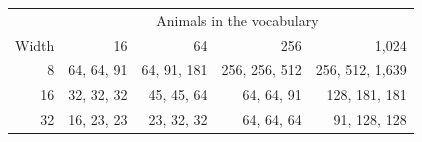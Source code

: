 \begin{tabular}{@{}rrrrr@{}}
\toprule
 & \multicolumn{4}{c}{Animals in the vocabulary} \\
Width & 16 & 64 & 256 & 1{,}024 \\
\midrule
8 & 64, 64, 91 & 64, 91, 181 & 256, 256, 512 & 256, 512, 1{,}639 \\
16 & 32, 32, 32 & 45, 45, 64 & 64, 64, 91 & 128, 181, 181 \\
32 & 16, 23, 23 & 23, 32, 32 & 64, 64, 64 & 91, 128, 128 \\
\bottomrule
\end{tabular}
